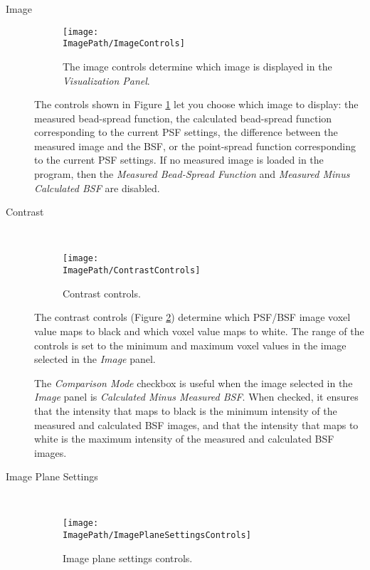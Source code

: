 \documentclass[11pt,titlepage,twoside]{article}
\begin{document}
\begin{description}

  \item[Image] \hfill
   \begin{figure}[h]
    \centering
    \texttt{[image: \\ImagePath/ImageControls]}
    \caption{The image controls determine which image is displayed in the \emph{Visualization Panel}.}
    \label{fig:ImageControls}
  \end{figure}
 
The controls shown in Figure \ref{fig:ImageControls} let you choose which image to display: the measured bead-spread function, the calculated bead-spread function corresponding to the current PSF settings, the difference between the measured image and the BSF, or  the point-spread function corresponding to the current PSF settings. If no measured image is loaded in the program, then the \emph{Measured Bead-Spread Function} and \emph{Measured Minus Calculated BSF} are disabled.

  \item[Contrast] \hfill \\
  
    \begin{figure}[h]
    \centering
    \texttt{[image: \\ImagePath/ContrastControls]}
    \caption{Contrast controls.}
    \label{fig:ContrastControls}
  \end{figure}
  
The contrast controls (Figure \ref{fig:ContrastControls}) determine which PSF/BSF image voxel value maps to black and which voxel value maps to white. The range of the controls is set to the minimum and maximum voxel values in the image selected in the \emph{Image} panel.
  
The \emph{Comparison Mode} checkbox is useful when the image selected in the \emph{Image} panel is \emph{Calculated Minus Measured BSF}. When checked, it ensures that the intensity that maps to black is the minimum intensity of the measured and calculated BSF images, and that the intensity that maps to white is the maximum intensity of the measured and calculated BSF images.

  \item[Image Plane Settings] \hfill \\
  
    \begin{figure}[h]
    \centering
    \texttt{[image: \\ImagePath/ImagePlaneSettingsControls]}
    \caption{Image plane settings controls.}
    \label{fig:ImagePlaneSettingsControls}
  \end{figure}
  

\end{description}
\end{document}
